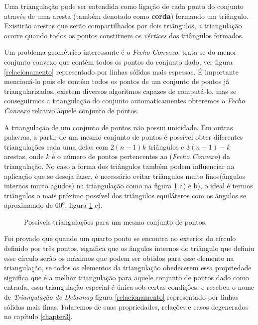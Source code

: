 \documentclass[12pt,a4paper]{book}
\begin{document}
Uma triangula\c{c}\~{a}o pode ser entendida como liga\c{c}\~{a}o de cada ponto do conjunto atrav\'es de uma aresta (tamb\'em denotado como {\bf corda}) formando um tri\^angulo. Existir\~ao arestas que ser\~ao compartilhados por dois tri\^angulos, a triangula\c{c}\~{a}o ocorre quando todos os pontos constituem os \textit{v\'ertices} dos tri\^angulos formados. 

Um problema geom\'etrico interessante \'e o \textit{Fecho Convexo}, trata-se do menor conjunto convexo que cont\'em todos os pontos do conjunto dado, ver figura \ref{relacionamento} representado por linhas s\'olidas mais espessas. \'E importante mencion\'a-lo pois ele cont\'em todos os pontos de um conjunto de pontos j\'a triangularizados, existem diversos algoritmos capazes de comput\'a-lo, mas se conseguirmos a triangula\c{c}\~{a}o do conjunto automaticamentes obteremos o \textit{Fecho Convexo} relativo \`aquele conjunto de pontos.

A triangula\c{c}\~{a}o de um conjunto de pontos n\~ao possui unicidade. Em outras palavras, a partir de um mesmo conjunto de pontos \'e poss\'ivel obter diferentes triangula\c{c}\~{o}es cada uma delas com $2(n-1)k$ tri\^angulos e $3(n-1)-k$ arestas, onde $k$ \'e o n\'umero de pontos pertencentes ao (\textit{Fecho Convexo}) da triangula\c{c}\~{a}o. No caso a forma dos tri\^angulos tamb\'em podem influenciar na aplica\c{c}\~{a}o que se deseja fazer, \'e necess\'ario evitar tri\^angulos muito finos(\^angulos internos muito agudos) na triangula\c{c}\~{a}o como na figura \ref{triangulations} a) e b), o ideal \'e termos tri\^angulos o mais pr\'oximo poss\'ivel dos tri\^angulos equil\'ateros com os \^angulos se aproximando de $60^{\textrm{o}}$, figura \ref{triangulations} c).

\begin{figure}[htbp]
  \begin{center}
    \leavevmode
    
    \caption{Poss\'iveis triangula\c{c}\~{o}es para um mesmo conjunto de pontos.}
    \label{triangulations}
  \end{center}
\end{figure}

Foi provado que quando um quarto ponto se encontra no exterior do c\'irculo definido por tr\^es pontos, significa que os \^angulos internos do tri\^angulo que definiu esse c\'irculo ser\~ao os m\'aximos que podem ser obtidos para esse elemento na triangula\c{c}\~{a}o, se todos os elementos da triangula\c{c}\~{a}o obedecerem essa propriedade significa que \'e a melhor triangula\c{c}\~{a}o para aquele conjunto de pontos dado como entrada, essa triangula\c{c}\~{a}o especial \'e \'unica sob certas condi\c{c}\~{o}es, e recebeu o nome de \textit{Triangula\c{c}\~{a}o de Delaunay} figura \ref{relacionamento} representado por linhas s\'olidas mais finas. Falaremos de suas propriedades, rela\c{c}\~{o}es e casos degenerados no cap\'itulo \ref{chapter3}.
 
\end{document}
